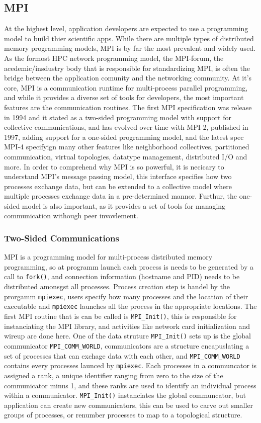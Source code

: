 \subsection{MPI}
At the highest level, application developers are expected to use a programming model to build thier scientific apps. 
While there are multiple types of distributed memory programming models, MPI is by far the most prevalent and widely used.
As the formost HPC network programming model, the MPI-forum, the acedemic/insdustry body that is responsible for standardizing MPI, is often the bridge between the application comunity and the networking community.
At it's core, MPI is a communication runtime for multi-process parallel programming, and while it provides a diverse set of tools for developers, the most important features are the communication routines.
The first MPI specification was release in 1994 and it stated as a two-sided programming model with support for collective communications, and has evolved over time with MPI-2, published in 1997, adding support for a one-sided programming model, and the latest spec MPI-4 specifyign many other features like neighborhood collectives, partitioned communication, virtual topologies, datatype management, distributed I/O and more.
In order to comprehend why MPI is so powerful, it is necicary to understand MPI's message passing model, this interface specifies how two processes exchange data, but can be extended to a collective model where multiple processes exchange data in a pre-determined mannor. 
Furthur, the one-sided model is also important, as it provides a set of tools for managing communication withough peer invovlement.

\subsubsection{Two-Sided Communications}
MPI is a programming model for multi-process distributed memory programming, so at programm launch each process is needs to be generated by a call to \texttt{fork()}, and connection information (hostname and PID) needs to be distributed amonsgst all processes. 
Process creation step is handel by the prorgamm \texttt{mpiexec}, users specify how many processes and the location of their executable and \texttt{mpiexec} launches all the process in the appropriate locations.
The first MPI routine that is can be called is \texttt{MPI\_Init()}, this is responsible for instanciating the MPI library, and activities like network card initialization and wireup are done here.  
One of the data struture \texttt{MPI\_Init()} sets up is the global communicator \texttt{MPI\_COMM\_WORLD}, communicators are a structure encapuslating a set of processes that can exchage data with each other, and \texttt{MPI\_COMM\_WORLD} contains every processes launced by \texttt{mpiexec}.
Each processes in a communcator is assigned a rank, a unique identifier ranging from zero to the size of the communicator minus 1, and these ranks are used to identify an individual process within a communicator.
\texttt{MPI\_Init()} instanciates the global communcator, but application can create new communicators, this can be used to carve out smaller groups of processes, or renumber processes to map to a topological structure.

